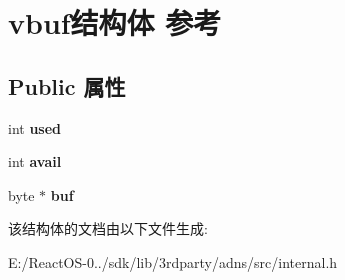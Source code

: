 \hypertarget{structvbuf}{}\section{vbuf结构体 参考}
\label{structvbuf}
\subsection*{Public 属性}
\begin{DoxyCompactItemize}
\item 
\mbox{\label{structvbuf_a4884a7ff876d3f21498cac035f42267d}} 
int {\bfseries used}
\item 
\mbox{\label{structvbuf_a0331ff2d6f9df52c7d35691650457f2f}} 
int {\bfseries avail}
\item 
\mbox{\label{structvbuf_ae14d742f6530da838a5dca09e4d33e8e}} 
byte $\ast$ {\bfseries buf}
\end{DoxyCompactItemize}


该结构体的文档由以下文件生成\+:\begin{DoxyCompactItemize}
\item 
E\+:/\+React\+O\+S-\/0../sdk/lib/3rdparty/adns/src/internal.\+h\end{DoxyCompactItemize}
